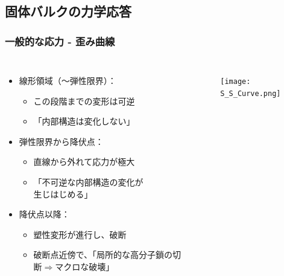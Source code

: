 \documentclass[1４pt, dvipdfmx]{beamer}
\begin{document}
\subsection{固体バルクの力学応答}
\begin{frame}
\frametitle{一般的な応力 - 歪み曲線}

\begin{columns}[totalwidth=1\textwidth]
	\begin{itemize}
	\item 線形領域（～弾性限界）：
		\begin{itemize}
		\item この段階までの変形は可逆
		\item {\color{red}「内部構造は変化しない」}
		\end{itemize}
	\item 弾性限界から降伏点：
		\begin{itemize}
		\item 直線から外れて応力が極大
		\item {\color{blue}「不可逆な内部構造の変化が\\生じはじめる」}
		\end{itemize}
	\item 降伏点以降：
		\begin{itemize}
		\item 塑性変形が進行し、破断
		\item 破断点近傍で、{\color{red}「局所的な高分子鎖の切断$\Rightarrow$マクロな破壊」}
		\end{itemize}
	\end{itemize}
	\begin{figure}
	\centering
	\texttt{[image: S\_S\_Curve.png]}
	\end{figure}
\end{columns}
\end{frame}
\end{document}
